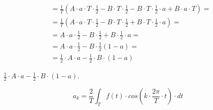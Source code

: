 \begin{task}
\begin{align*}
&=\frac{1}{T}\left(A \cdot a\cdot T \cdot \frac{1}{2} - B \cdot T \cdot \frac{1}{2} - B \cdot T \cdot \frac{1}{2}\cdot a +B\cdot a \cdot T \right)=\\
&=\frac{1}{T}\left(A \cdot a\cdot T \cdot \frac{1}{2} - B \cdot T \cdot \frac{1}{2} + B \cdot T \cdot \frac{1}{2}\cdot a\right)=\\
&=A \cdot a \cdot \frac{1}{2} - B \cdot \frac{1}{2} + B \cdot \frac{1}{2}\cdot a=\\
&=A \cdot a \cdot \frac{1}{2} - B \cdot \frac{1}{2} \left( 1 - a \right)=\\
&=\frac{1}{2} \cdot A \cdot a - \frac{1}{2} \cdot B \cdot \left( 1 - a \right)
\end{align*}

 $\frac{1}{2} \cdot A \cdot a - \frac{1}{2} \cdot B \cdot \left( 1 - a \right)$.


\begin{equation}
 a_k=\frac{2}{T}\int_{T}f(t) \cdot cos\left( k \cdot \frac{2\pi}{T} \cdot t\right) \cdot dt
\end{equation}



\end{task}
